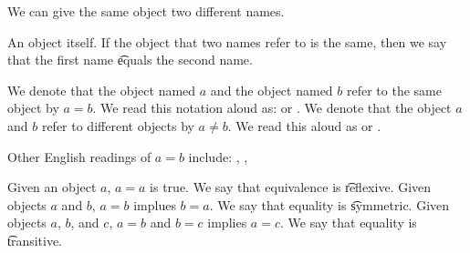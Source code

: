 

We can give the same object two different names.


An object  itself.
If the object that two names refer to is the same, then we say that the first name \t{equals} the second name.


We denote that the object named $a$ and the object named $b$ refer to the same object by $a = b$.
We read this notation aloud as:  or .
We denote that the object $a$ and $b$ refer to different objects by $a \neq b$.
We read this aloud as  or .

Other English readings of $a = b$ include: ,
, 


Given an object $a$, $a = a$ is true.
We say that equivalence is \t{reflexive}.
Given objects $a$ and $b$, $a = b$ implues $b = a$.
We say that equality is \t{symmetric}.
Given objects $a$, $b$, and $c$, $a = b$ and $b = c$ implies $a = c$.
We say that equality is \t{transitive}.

\blankpage
